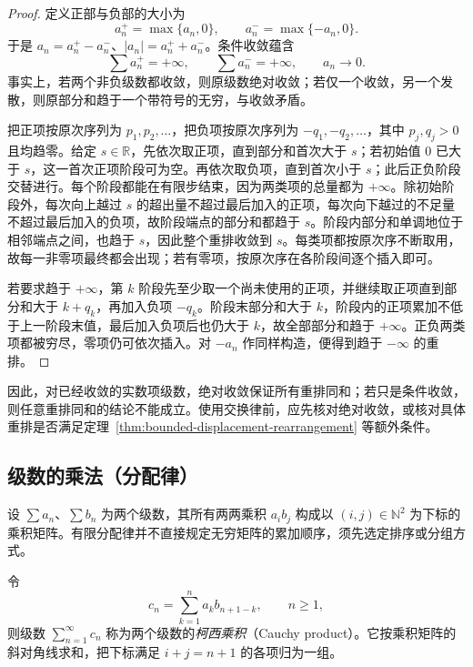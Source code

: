 \begin{proof}
定义正部与负部的大小为
\[
    a_n^+=\max\{a_n,0\},\qquad a_n^-=\max\{-a_n,0\}.
\]
于是 $a_n=a_n^+-a_n^-$、$|a_n|=a_n^++a_n^-$。条件收敛蕴含
\begin{equation}
    \sum a_n^+=+\infty,\qquad \sum a_n^-=+\infty,
    \qquad a_n\to0.
    \label{eq:conditional-series-positive-negative-parts}
\end{equation}
事实上，若两个非负级数都收敛，则原级数绝对收敛；若仅一个收敛，另一个发散，则原部分和趋于一个带符号的无穷，与收敛矛盾。

把正项按原次序列为 $p_1,p_2,\ldots$，把负项按原次序列为 $-q_1,-q_2,\ldots$，其中 $p_j,q_j>0$ 且均趋零。给定 $s\in\mathbb R$，先依次取正项，直到部分和首次大于 $s$；若初始值 $0$ 已大于 $s$，这一首次正项阶段可为空。再依次取负项，直到首次小于 $s$；此后正负阶段交替进行。每个阶段都能在有限步结束，因为两类项的总量都为 $+\infty$。除初始阶段外，每次向上越过 $s$ 的超出量不超过最后加入的正项，每次向下越过的不足量不超过最后加入的负项，故阶段端点的部分和都趋于 $s$。阶段内部分和单调地位于相邻端点之间，也趋于 $s$，因此整个重排收敛到 $s$。每类项都按原次序不断取用，故每一非零项最终都会出现；若有零项，按原次序在各阶段间逐个插入即可。

若要求趋于 $+\infty$，第 $k$ 阶段先至少取一个尚未使用的正项，并继续取正项直到部分和大于 $k+q_k$，再加入负项 $-q_k$。阶段末部分和大于 $k$，阶段内的正项累加不低于上一阶段末值，最后加入负项后也仍大于 $k$，故全部部分和趋于 $+\infty$。正负两类项都被穷尽，零项仍可依次插入。对 $-a_n$ 作同样构造，便得到趋于 $-\infty$ 的重排。
\end{proof}

因此，对已经收敛的实数项级数，绝对收敛保证所有重排同和；若只是条件收敛，则任意重排同和的结论不能成立。使用交换律前，应先核对绝对收敛，或核对具体重排是否满足定理~\ref{thm:bounded-displacement-rearrangement} 等额外条件。

\subsection{级数的乘法（分配律）}
\label{subsec:multiplication-and-distributivity-of-series}

设 $\sum a_n$、$\sum b_n$ 为两个级数，其所有两两乘积 $a_ib_j$ 构成以 $(i,j)\in\mathbb N^2$ 为下标的乘积矩阵。有限分配律并不直接规定无穷矩阵的累加顺序，须先选定排序或分组方式。

\begin{definition}
令
\begin{equation}
    c_n=\sum_{k=1}^n a_kb_{n+1-k},\qquad n\geq1,
    \label{eq:cauchy-product-coefficients}
\end{equation}
则级数 $\sum_{n=1}^{\infty}c_n$ 称为两个级数的\emph{柯西乘积}（Cauchy product）。它按乘积矩阵的斜对角线求和，把下标满足 $i+j=n+1$ 的各项归为一组。
\end{definition}

